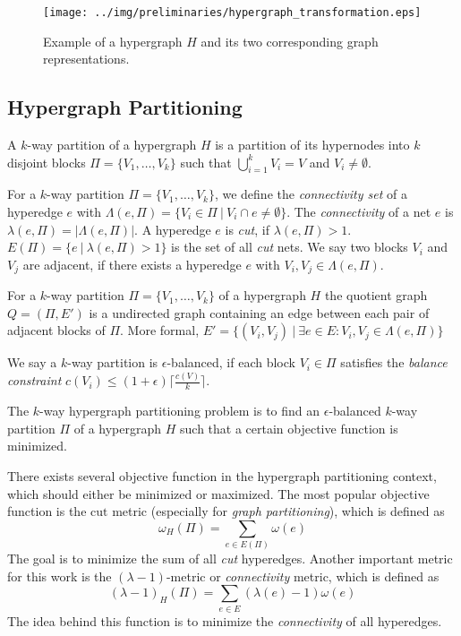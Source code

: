 \begin{figure}
\centering
\texttt{[image: ../img/preliminaries/hypergraph\_transformation.eps]}
\caption{Example of a hypergraph $H$ and its two corresponding graph representations.} 
\label{img:hypergraph_transformation}
\end{figure}

\subsection{Hypergraph Partitioning}
\label{sec:hypergraph_partitioning}

\begin{definition}
A $k$-way partition of a hypergraph $H$ is a partition of its hypernodes into
$k$ disjoint blocks $\Pi = \{V_1,\ldots,V_k\}$ such that $\bigcup_{i=1}^{k} V_i = V$
and $V_i \neq \emptyset$.
\label{def:kway_partition}
\end{definition}

For a $k$-way partition $\Pi = \{V_1,\ldots,V_k\}$, we define the \emph{connectivity set} of a
hyperedge $e$ with $\Lambda(e,\Pi) = \{V_i \in \Pi\ |\ V_i \cap e \neq \emptyset\}$. The \emph{connectivity}
of a net $e$ is $\lambda(e,\Pi) = |\Lambda(e,\Pi)|$. A hyperedge $e$ is \emph{cut}, if
$\lambda(e,\Pi) > 1$. $E(\Pi) = \{e\ |\ \lambda(e,\Pi) > 1\}$ is the set of all \emph{cut} 
nets. We say two blocks $V_i$ and $V_j$ are adjacent, if there exists a hyperedge
$e$ with $V_i,V_j \in \Lambda(e,\Pi)$.

\begin{definition}
For a $k$-way partition $\Pi = \{V_1,\ldots,V_k\}$ of a hypergraph $H$ 
the quotient graph $Q = (\Pi,E')$ is a undirected graph containing an 
edge between each pair of adjacent blocks of $\Pi$.
More formal, $E' = \{(V_i,V_j)\ |\ \exists e \in E: V_i,V_j \in \Lambda(e,\Pi)\}$
\label{def:quotient_graph}
\end{definition}

We say a $k$-way partition is $\epsilon$-balanced, if each block 
$V_i \in \Pi$ satisfies the \emph{balance constraint} 
$c(V_i) \le (1+\epsilon)\lceil\frac{c(V)}{k}\rceil$.

\begin{definition}
The $k$-way hypergraph partitioning problem is to find an $\epsilon$-balanced $k$-way
partition $\Pi$ of a hypergraph $H$ such that a certain objective function is minimized.
\label{def:kway_partitioning_problem}
\end{definition}

There exists several objective function in the hypergraph partitioning context,
which should either be minimized or maximized. The most popular objective function 
is the $\text{cut}$ metric (especially for \emph{graph partitioning}), which is defined as
\[\omega_H(\Pi) = \sum_{e \in E(\Pi)} \omega(e)\]
The goal is to minimize the sum of all \emph{cut} hyperedges. Another important metric
for this work is the $(\lambda - 1)$-metric or \emph{connectivity} metric, 
which is defined as
\[(\lambda - 1)_H(\Pi) = \sum_{e \in E} (\lambda(e) - 1)\omega(e)\]
The idea behind this function is to minimize the \emph{connectivity} of all hyperedges.